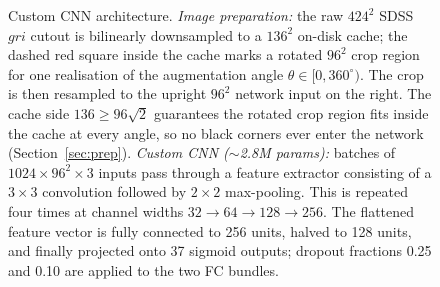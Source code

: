 \documentclass[10pt,preprint2]{aastex}
\begin{document}
\begin{figure}[t!]
  \caption{Custom CNN architecture. \emph{Image preparation:} the raw $424^2$ SDSS $gri$ cutout is bilinearly downsampled to a $136^2$ on-disk cache; the dashed red square inside the cache marks a rotated $96^2$ crop region for one realisation of the augmentation angle $\theta \in [0, 360^\circ)$. The crop is then resampled to the upright $96^2$ network input on the right. The cache side $136 \ge 96\sqrt{2}$ guarantees the rotated crop region fits inside the cache at every angle, so no black corners ever enter the network (Section~\ref{sec:prep}). \emph{Custom CNN ($\sim$2.8M params):} batches of $1024{\times}96^2{\times}3$ inputs pass through a feature extractor consisting of a $3{\times}3$ convolution followed by $2{\times}2$ max-pooling. This is repeated four times at channel widths $32 \to 64 \to 128 \to 256$. The flattened feature vector is fully connected to 256 units, halved to 128 units, and finally projected onto 37 sigmoid outputs; dropout fractions 0.25 and 0.10 are applied to the two FC bundles.}
  \label{fig:architectures}
\end{figure}
\end{document}
